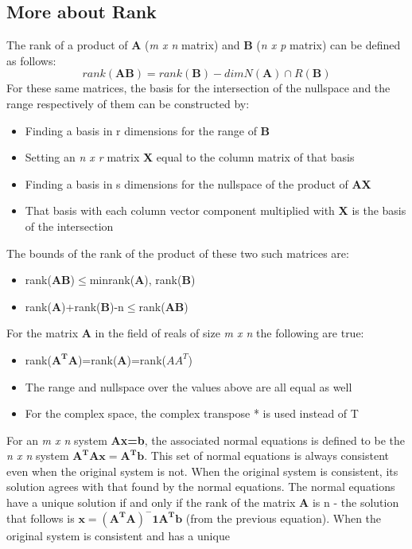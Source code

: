 \documentclass[12pt]{article}
\begin{document}
\subsection{More about Rank}
The rank of a product of \textbf{A} (\textit{m x n} matrix) and \textbf{B} (\textit{n x p} matrix) can be defined as follows:
$$
rank(\mathbf{AB})=rank(\mathbf{B})-dimN(\mathbf{A})\cap R(\textbf{B})
$$
For these same matrices, the basis for the intersection of the nullspace and the range respectively of them can be constructed by:
\begin{itemize}
    \item Finding a basis in r dimensions for the range of \textbf{B}
    \item Setting an \textit{n x r} matrix \textbf{X} equal to the column matrix of that basis
    \item Finding a basis in s dimensions for the nullspace of the product of \textbf{AX}
    \item That basis with each column vector component multiplied with \textbf{X} is the basis of the intersection
\end{itemize}
The bounds of the rank of the product of these two such matrices are:
\begin{itemize}
    \item rank(\textbf{AB})$\leq$min{rank(\textbf{A}), rank(\textbf{B})}
    \item rank(\textbf{A})+rank(\textbf{B})-n$\leq$rank(\textbf{AB})
\end{itemize}
For the matrix \textbf{A} in the field of reals of size \textit{m x n} the following are true:
\begin{itemize}
    \item rank($\mathbf{A^TA}$)=rank(\textbf{A})=rank($AA^T$)
    \item The range and nullspace over the values above are all equal as well
    \item For the complex space, the complex transpose * is used instead of T
\end{itemize}
For an \textit{m x n} system \textbf{Ax=b}, the associated normal equations is defined to be the \textit{n x n} system $\mathbf{A^TAx=A^Tb}$. This set of normal equations is always consistent 
even when the original system is not. When the original system is consistent, its solution agrees with that found by the normal equations. The normal equations have a unique solution if and 
only if the rank of the matrix \textbf{A} is n - the solution that follows is $\mathbf{x=(A^TA)^-1A^Tb}$ (from the previous equation). When the original system is consistent and has a unique 
\end{document}
